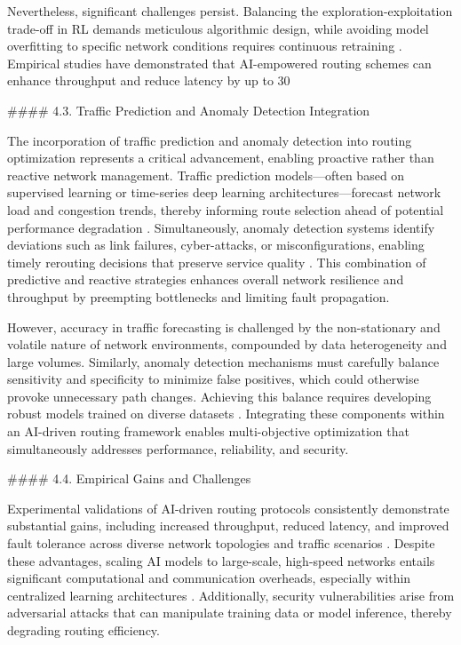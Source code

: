 \documentclass[11pt]{article}
\begin{document}
\begin{itemize}
Nevertheless, significant challenges persist. Balancing the exploration-exploitation trade-off in RL demands meticulous algorithmic design, while avoiding model overfitting to specific network conditions requires continuous retraining \cite{ref53}. Empirical studies have demonstrated that AI-empowered routing schemes can enhance throughput and reduce latency by up to 30%

#### 4.3. Traffic Prediction and Anomaly Detection Integration

The incorporation of traffic prediction and anomaly detection into routing optimization represents a critical advancement, enabling proactive rather than reactive network management. Traffic prediction models—often based on supervised learning or time-series deep learning architectures—forecast network load and congestion trends, thereby informing route selection ahead of potential performance degradation \cite{ref50}. Simultaneously, anomaly detection systems identify deviations such as link failures, cyber-attacks, or misconfigurations, enabling timely rerouting decisions that preserve service quality \cite{ref53}. This combination of predictive and reactive strategies enhances overall network resilience and throughput by preempting bottlenecks and limiting fault propagation.

However, accuracy in traffic forecasting is challenged by the non-stationary and volatile nature of network environments, compounded by data heterogeneity and large volumes. Similarly, anomaly detection mechanisms must carefully balance sensitivity and specificity to minimize false positives, which could otherwise provoke unnecessary path changes. Achieving this balance requires developing robust models trained on diverse datasets \cite{ref50}. Integrating these components within an AI-driven routing framework enables multi-objective optimization that simultaneously addresses performance, reliability, and security.

#### 4.4. Empirical Gains and Challenges

Experimental validations of AI-driven routing protocols consistently demonstrate substantial gains, including increased throughput, reduced latency, and improved fault tolerance across diverse network topologies and traffic scenarios \cite{ref4}. Despite these advantages, scaling AI models to large-scale, high-speed networks entails significant computational and communication overheads, especially within centralized learning architectures \cite{ref53}. Additionally, security vulnerabilities arise from adversarial attacks that can manipulate training data or model inference, thereby degrading routing efficiency.


\end{itemize}
\end{document}
